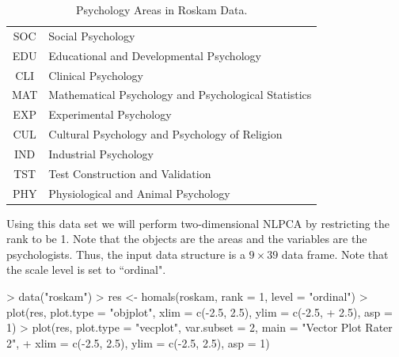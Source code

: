 \documentclass[article, nojss]{jss}
\begin{document}
\begin{table}[ht]
\centering
\begin{tabular}{|c|l|}
\hline
SOC& Social Psychology\\
EDU& Educational and Developmental Psychology\\
CLI& Clinical Psychology\\
MAT& Mathematical Psychology and Psychological Statistics\\
EXP& Experimental Psychology\\
CUL& Cultural Psychology and Psychology of Religion\\
IND& Industrial Psychology\\
TST& Test Construction and Validation\\
PHY& Physiological and Animal Psychology\\
\hline
\end{tabular}
\caption{\label{tab:area}Psychology Areas in Roskam Data.}
\end{table}

Using this data set we will perform two-dimensional NLPCA by restricting the rank to be 1. Note that the objects are the areas and the variables are the psychologists. Thus, the input data structure is a $9 \times 39$ data frame. Note that the scale level is set to ``ordinal".

\begin{Schunk}
\begin{Sinput}
> data("roskam")
> res <- homals(roskam, rank = 1, level = "ordinal")
> plot(res, plot.type = "objplot", xlim = c(-2.5, 2.5), ylim = c(-2.5, 
+     2.5), asp = 1)
> plot(res, plot.type = "vecplot", var.subset = 2, main = "Vector Plot Rater 2", 
+     xlim = c(-2.5, 2.5), ylim = c(-2.5, 2.5), asp = 1)
\end{Sinput}
\end{Schunk}
\end{document}
